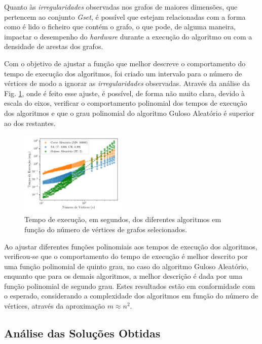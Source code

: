 \documentclass[mirror, portugues]{revdetua}
\begin{document}
Quanto às \textit{irregularidades} observadas nos grafos de maiores dimensões, que pertencem ao conjunto \textit{Gset}, é possível que estejam relacionadas com a forma como é lido o ficheiro que contém o grafo, o que pode, de alguma maneira, impactar o desempenho do \textit{hardware} durante a execução do algoritmo ou com a densidade de arestas dos grafos.


Com o objetivo de ajustar a função que melhor descreve o comportamento do tempo de execução dos algoritmos, foi criado um intervalo para o número de vértices de modo a ignorar as \textit{irregularidades} observadas. Através da análise da Fig. \ref{fig:time_interval}, onde é feito esse ajuste, é possível, de forma não muito clara, devido à escala do eixos, verificar o comportamento polinomial dos tempos de execução dos algoritmos e que o grau polinomial do algoritmo Guloso Aleatório é superior ao dos restantes.

\begin{figure}[H]
    \centering
    \includegraphics[width=0.45\textwidth]{../assets/time_interval.png}
    \caption{Tempo de execução, em segundos, dos diferentes algoritmos em função do número de vértices de grafos selecionados.}
    \label{fig:time_interval}
\end{figure}

Ao ajustar diferentes funções polinomiais aos tempos de execução dos algoritmos, verificou-se que o comportamento do tempo de execução é melhor descrito por uma função polinomial de quinto grau, no caso do algoritmo Guloso Aleatório, enquanto que para os demais algoritmos, a melhor descrição é dada por uma função polinomial de segundo grau. Estes resultados estão em conformidade com o esperado, considerando a complexidade dos algoritmos em função do número de vértices, através da aproximação $m \approx n^2$.


\subsection{Análise das Soluções Obtidas}
\end{document}
